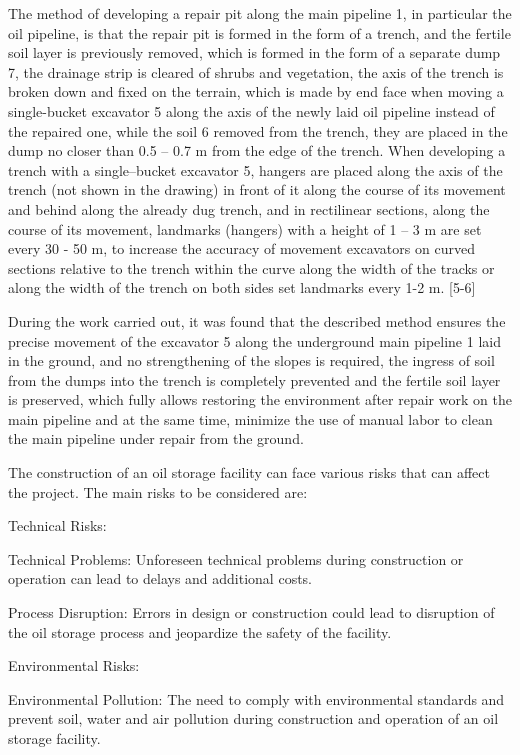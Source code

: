 The method of developing a repair pit along the main pipeline 1, in
particular the oil pipeline, is that the repair pit is formed in the
form of a trench, and the fertile soil layer is previously removed,
which is formed in the form of a separate dump 7, the drainage strip is
cleared of shrubs and vegetation, the axis of the trench is broken down
and fixed on the terrain, which is made by end face when moving a
single-bucket excavator 5 along the axis of the newly laid oil pipeline
instead of the repaired one, while the soil 6 removed from the trench,
they are placed in the dump no closer than 0.5 -- 0.7 m from the edge of
the trench. When developing a trench with a single--bucket excavator 5,
hangers are placed along the axis of the trench (not shown in the
drawing) in front of it along the course of its movement and behind
along the already dug trench, and in rectilinear sections, along the
course of its movement, landmarks (hangers) with a height of 1 -- 3 m
are set every 30 - 50 m, to increase the accuracy of movement excavators
on curved sections relative to the trench within the curve along the
width of the tracks or along the width of the trench on both sides set
landmarks every 1-2 m. {[}5-6{]}

During the work carried out, it was found that the described method
ensures the precise movement of the excavator 5 along the underground
main pipeline 1 laid in the ground, and no strengthening of the slopes
is required, the ingress of soil from the dumps into the trench is
completely prevented and the fertile soil layer is preserved, which
fully allows restoring the environment after repair work on the main
pipeline and at the same time, minimize the use of manual labor to clean
the main pipeline under repair from the ground.

The construction of an oil storage facility can face various risks that
can affect the project. The main risks to be considered are:

Technical Risks:

Technical Problems: Unforeseen technical problems during construction or
operation can lead to delays and additional costs.

Process Disruption: Errors in design or construction could lead to
disruption of the oil storage process and jeopardize the safety of the
facility.

Environmental Risks:

Environmental Pollution: The need to comply with environmental standards
and prevent soil, water and air pollution during construction and
operation of an oil storage facility.

